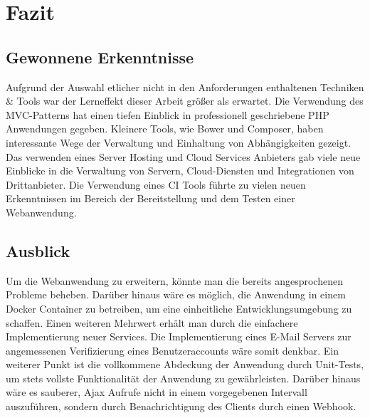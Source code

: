 \chapter{Fazit}\label{ch:fazit}
\section{Gewonnene Erkenntnisse}\label{sec:gewonnene-erkenntnisse}
Aufgrund der Auswahl etlicher nicht in den Anforderungen enthaltenen Techniken \&{} Tools war der Lerneffekt dieser Arbeit größer als erwartet. Die Verwendung des MVC-Patterns hat einen tiefen Einblick in professionell geschriebene PHP Anwendungen gegeben. Kleinere Tools, wie Bower und Composer, haben interessante Wege der Verwaltung und Einhaltung von Abhängigkeiten gezeigt.\\
Das verwenden eines Server Hosting und Cloud Services Anbieters gab viele neue Einblicke in die Verwaltung von Servern, Cloud-Diensten und Integrationen von Drittanbieter. Die Verwendung eines CI Tools führte zu vielen neuen Erkenntnissen im Bereich der Bereitstellung und dem Testen einer Webanwendung.

\section{Ausblick}\label{sec:ausblick}
Um die Webanwendung zu erweitern, könnte man die bereits angesprochenen Probleme beheben.
Darüber hinaus wäre es möglich, die Anwendung in einem Docker Container zu betreiben, um eine einheitliche Entwicklungsumgebung zu schaffen. Einen weiteren Mehrwert erhält man durch die einfachere Implementierung neuer Services. Die Implementierung eines E-Mail Servers zur angemessenen Verifizierung eines Benutzeraccounts wäre somit denkbar. 
Ein weiterer Punkt ist die vollkommene Abdeckung der Anwendung durch Unit-Tests, um stets vollste Funktionalität der Anwendung zu gewährleisten. Darüber hinaus wäre es sauberer, Ajax Aufrufe nicht in einem vorgegebenen Intervall auszuführen, sondern durch Benachrichtigung des Clients durch einen Webhook.